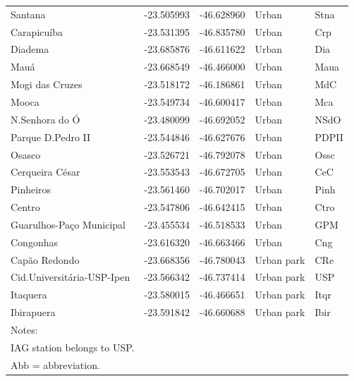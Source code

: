 \begin{table}[!ht]
\begin{tabular}{lrrll}
                    Santana & -23.505993 & -46.628960 &                Urban &   Stna \\
                Carapicuíba & -23.531395 & -46.835780 &                Urban &    Crp \\
                    Diadema & -23.685876 & -46.611622 &                Urban &    Dia \\
                       Mauá & -23.668549 & -46.466000 &                Urban &   Maua \\
            Mogi das Cruzes & -23.518172 & -46.186861 &                Urban &    MdC \\
                      Mooca & -23.549734 & -46.600417 &                Urban &    Mca \\
             N.Senhora do Ó & -23.480099 & -46.692052 &                Urban &   NSdO \\
          Parque D.Pedro II & -23.544846 & -46.627676 &                Urban &  PDPII \\
                     Osasco & -23.526721 & -46.792078 &                Urban &   Ossc \\
            Cerqueira César & -23.553543 & -46.672705 &                Urban &    CeC \\
                  Pinheiros & -23.561460 & -46.702017 &                Urban &   Pinh \\
                     Centro & -23.547806 & -46.642415 &                Urban &   Ctro \\
   Guarulhos-Paço Municipal & -23.455534 & -46.518533 &                Urban &    GPM \\
                  Congonhas & -23.616320 & -46.663466 &                Urban &    Cng \\
              Capão Redondo & -23.668356 & -46.780043 &           Urban park &    CRe \\
 Cid.Universitária-USP-Ipen & -23.566342 & -46.737414 &           Urban park &    USP \\
                   Itaquera & -23.580015 & -46.466651 &           Urban park &   Itqr \\
                 Ibirapuera & -23.591842 & -46.660688 &           Urban park &   Ibir \\
	\bottomrule
	Notes:\\
	IAG station belongs to USP.\\
	Abb = abbreviation.
	\end{tabular}
\end{table}

